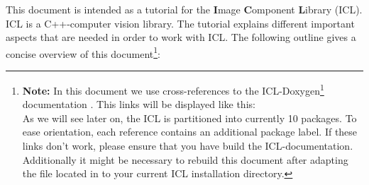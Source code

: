 %
%

This document is intended as a tutorial for the \textbf{I}mage \textbf{C}omponent \textbf{L}ibrary (ICL). ICL is a C++-computer vision library. The tutorial explains different important aspects that are needed in order to work with ICL. The following outline gives a concise overview of this document\footnote{
\textbf{Note:} In this document we use cross-references to the ICL-Doxygen\footnote{see www.doxygen.org} documentation \iclrefref. This links will be displayed like this:
\\
As we will see later on, the ICL is partitioned into currently 10 packages. To ease orientation, each reference contains an additional package label. If these links don't work, please ensure that you have build the ICL-documentation. Additionally it might be necessary to rebuild this document after adapting the  file located in  to your current ICL installation directory.
}:

